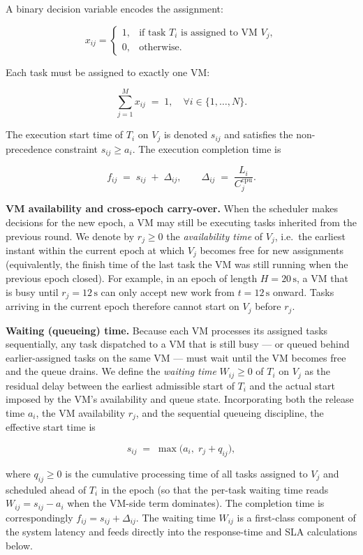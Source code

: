\documentclass[11pt,a4paper]{article}
\begin{document}
A binary decision variable encodes the assignment:

$$
x_{ij} =
\begin{cases}
1, & \text{if task } T_i \text{ is assigned to VM } V_j, \\
0, & \text{otherwise.}
\end{cases}
$$

Each task must be assigned to exactly one VM:

$$
\sum_{j=1}^{M} x_{ij} \;=\; 1, \quad \forall i \in \{1,\ldots,N\}.
$$

The execution start time of $T_i$ on $V_j$ is denoted $s_{ij}$ and satisfies the non-precedence constraint $s_{ij} \geq a_i$. The execution completion time is

$$
f_{ij} \;=\; s_{ij} \;+\; \Delta_{ij}, \qquad \Delta_{ij} \;=\; \frac{L_i}{C^{\text{cpu}}_j}.
$$

\textbf{VM availability and cross-epoch carry-over.} When the scheduler makes decisions for the new epoch, a VM may still be executing tasks inherited from the previous round. We denote by $r_j \geq 0$ the \emph{availability time} of $V_j$, i.e.\ the earliest instant within the current epoch at which $V_j$ becomes free for new assignments (equivalently, the finish time of the last task the VM was still running when the previous epoch closed). For example, in an epoch of length $H = 20\,\text{s}$, a VM that is busy until $r_j = 12\,\text{s}$ can only accept new work from $t = 12\,\text{s}$ onward. Tasks arriving in the current epoch therefore cannot start on $V_j$ before $r_j$.

\textbf{Waiting (queueing) time.} Because each VM processes its assigned tasks sequentially, any task dispatched to a VM that is still busy --- or queued behind earlier-assigned tasks on the same VM --- must wait until the VM becomes free and the queue drains. We define the \emph{waiting time} $W_{ij} \geq 0$ of $T_i$ on $V_j$ as the residual delay between the earliest admissible start of $T_i$ and the actual start imposed by the VM's availability and queue state. Incorporating both the release time $a_i$, the VM availability $r_j$, and the sequential queueing discipline, the effective start time is

$$
s_{ij} \;=\; \max\!\big(a_i,\; r_j + q_{ij}\big),
$$

where $q_{ij} \geq 0$ is the cumulative processing time of all tasks assigned to $V_j$ and scheduled ahead of $T_i$ in the epoch (so that the per-task waiting time reads $W_{ij} = s_{ij} - a_i$ when the VM-side term dominates). The completion time is correspondingly $f_{ij} = s_{ij} + \Delta_{ij}$. The waiting time $W_{ij}$ is a first-class component of the system latency and feeds directly into the response-time and SLA calculations below.
\end{document}
